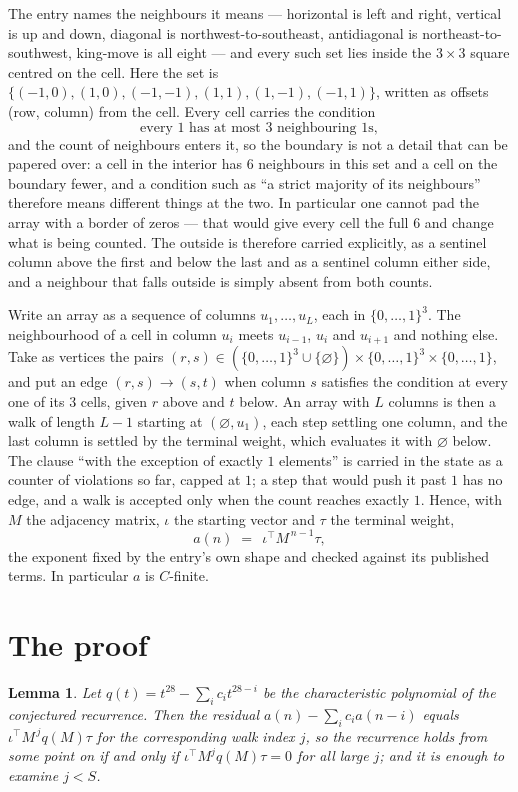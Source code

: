 \documentclass[11pt,a4paper]{article}
\theoremstyle{plain}
\newtheorem{lemma}[theorem]{Lemma}
\theoremstyle{definition}
\begin{document}
The entry names the neighbours it means --- horizontal is left and right, vertical is up and
down, diagonal is northwest-to-southeast, antidiagonal is northeast-to-southwest, king-move is
all eight --- and every such set lies inside the $3\times3$ square centred on the cell. Here
the set is $\{(-1,0), (1,0), (-1,-1), (1,1), (1,-1), (-1,1)\}$, written as offsets (row, column) from the cell. Every cell carries
the condition
\[
\text{every 1 has at most 3 neighbouring 1s},
\]
and the count of neighbours enters it, so the boundary is not a detail that can be papered
over: a cell in the interior has $6$ neighbours in this set and a cell on the boundary
fewer, and a condition such as ``a strict majority of its neighbours'' therefore means
different things at the two. In particular one cannot pad the array with a border of zeros ---
that would give every cell the full $6$ and change what is being counted. The outside is
therefore carried
explicitly, as a sentinel column above the first and below the last and as a sentinel column
either side, and a neighbour that falls outside is simply absent from both counts.

Write an array as a sequence of columns $u_1,\dots,u_L$, each in
$\{0,\dots,1\}^{3}$. The neighbourhood of a cell in column $u_i$ meets $u_{i-1}$,
$u_i$ and $u_{i+1}$ and nothing else. Take as vertices the pairs
$(r,s)\in(\{0,\dots,1\}^{3}\cup\{\varnothing\})\times\{0,\dots,1\}^{3} \times \{0,\dots,1\}$,
and put an edge $(r,s)\to(s,t)$ when column $s$ satisfies the condition at every one of its
$3$ cells, given $r$ above and $t$ below. An array with $L$ columns is then a walk of length
$L-1$ starting at $(\varnothing,u_1)$, each step settling one column, and the last column is
settled by the terminal weight, which evaluates it with $\varnothing$ below. The clause ``with the exception of exactly $1$ elements'' is carried in
the state as a counter of violations so far, capped at $1$; a step that would push it past
$1$ has no edge, and a walk is accepted only when the count reaches exactly $1$. Hence,
with $M$ the adjacency matrix, $\iota$ the starting vector and $\tau$ the terminal weight,
\[
a(n)\;=\;\,\iota^{\!\top}M^{\,n-1}\tau ,
\]
the exponent fixed by the entry's own shape and checked against its published terms. In
particular $a$ is $C$-finite.

\section{The proof}

\begin{lemma}\label{lem:crit}
Let $q(t)=t^{28}-\sum_i c_it^{28-i}$ be the characteristic polynomial of the
conjectured recurrence. Then the residual $a(n)-\sum_ic_ia(n-i)$ equals
$\iota^{\!\top}M^{\,j}q(M)\tau$ for the corresponding walk index $j$, so the
recurrence holds from some point on if and only if $\iota^{\!\top}M^{j}q(M)\tau=0$ for all
large $j$; and it is enough to examine $j<S$.
\end{lemma}
\end{document}

